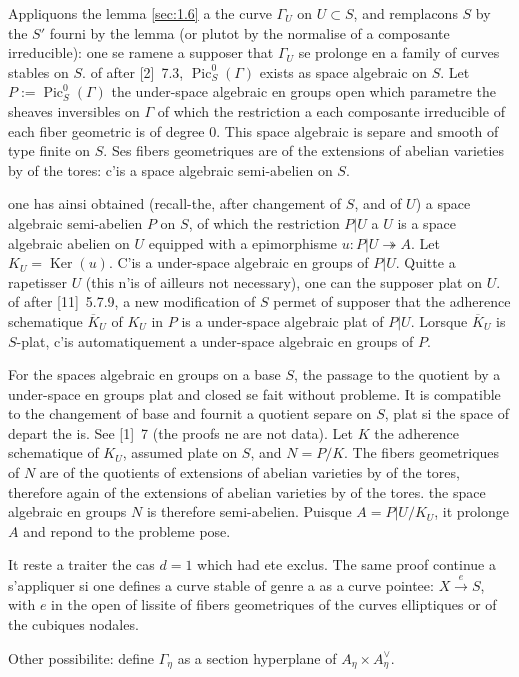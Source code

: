 \documentclass[12pt,a4paper]{article}
\theoremstyle{plain}
\theoremstyle{definition}
\theoremstyle{remark}
\DeclareMathOperator{\Pic}{Pic}
\DeclareMathOperator{\Ker}{Ker}
\begin{document}
Appliquons the lemma \ref{sec:1.6} a the curve $\Gamma_U$ on $U \subset S$, and remplacons $S$ by the $S'$ fourni by the lemma (or plutot by the normalise of a composante irreducible): one se ramene a supposer that $\Gamma_U$ se prolonge en a family of curves stables on $S$. of after [2]~7.3, $\Pic_S^0(\Gamma)$ exists as space algebraic on $S$. Let $P := \Pic_S^0(\Gamma)$ the under-space algebraic en groups open which parametre the sheaves inversibles on $\Gamma$ of which the restriction a each composante irreducible of each fiber geometric is of degree $0$. This space algebraic is separe and smooth of type finite on $S$. Ses fibers geometriques are of the extensions of abelian varieties by of the tores: c'is a space algebraic semi-abelien on $S$.

one has ainsi obtained (recall-the, after changement of $S$, and of $U$) a space algebraic semi-abelien $P$ on $S$, of which the restriction $P|U$ a $U$ is a space algebraic abelien on $U$ equipped with a epimorphisme $u : P|U \twoheadrightarrow A$. Let $K_U = \Ker(u)$. C'is a under-space algebraic en groups of $P|U$. Quitte a rapetisser $U$ (this n'is of ailleurs not necessary), one can the supposer plat on $U$. of after [11]~5.7.9, a new modification of $S$ permet of supposer that the adherence schematique $\overline{K}_U$ of $K_U$ in $P$ is a under-space algebraic plat of $P|U$. Lorsque $\overline{K}_U$ is $S$-plat, c'is automatiquement a under-space algebraic en groups of $P$.

For the spaces algebraic en groups on a base $S$, the passage to the quotient by a under-space en groups plat and closed se fait without probleme. It is compatible to the changement of base and fournit a quotient separe on $S$, plat si the space of depart the is. See [1]~7 (the proofs ne are not data). Let $K$ the adherence schematique of $K_U$, assumed plate on $S$, and $N = P/K$. The fibers geometriques of $N$ are of the quotients of extensions of abelian varieties by of the tores, therefore again of the extensions of abelian varieties by of the tores. the space algebraic en groups $N$ is therefore semi-abelien. Puisque $A = P|U/K_U$, it prolonge $A$ and repond to the probleme pose.

It reste a traiter the cas $d = 1$ which had ete exclus. The same proof continue a s'appliquer si one defines a curve stable of genre a as a curve pointee: $X \xrightarrow{e} S$, with $e$ in the open of lissite of fibers geometriques of the curves elliptiques or of the cubiques nodales.

Other possibilite: define $\Gamma_\eta$ as a section hyperplane of $A_\eta \times A_\eta^\vee$.
\end{document}

